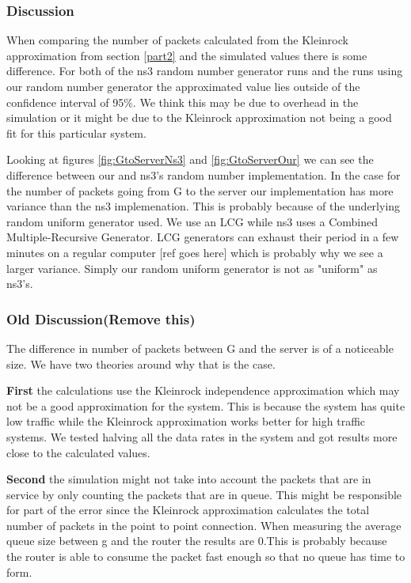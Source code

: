 \documentclass{article}
\begin{document}
\subsubsection{Discussion}
When comparing the number of packets calculated from the Kleinrock approximation from section \ref{part2} and the simulated values there is some difference.
For both of the ns3 random number generator runs and the runs using our random number generator the approximated value lies outside of the confidence interval of 95\%.
We think this may be due to overhead in the simulation or it might be due to the Kleinrock approximation not being a good fit for this particular system.

Looking at figures \ref{fig:GtoServerNs3} and \ref{fig:GtoServerOur} we can see the difference between our and ns3's random number implementation.
In the case for the number of packets going from G to the server our implementation has more variance than the ns3 implemenation.
This is probably because of the underlying random uniform generator used.
We use an LCG while ns3 uses a Combined Multiple-Recursive Generator.
LCG generators can exhaust their period in a few minutes on a regular computer [ref goes here] which is probably why we see a larger variance.
Simply our random uniform generator is not as "uniform" as ns3's.

\subsubsection{Old Discussion(Remove this)}
The difference in number of packets between G and the server is of a noticeable size. We have 
two theories around why that is the case.

\textbf{First} the calculations use the Kleinrock independence approximation which may not be 
a good approximation for the system. This is because the system has quite low traffic while the 
Kleinrock approximation works better for high traffic systems. We tested halving all the data 
rates in the system and got results more close to the calculated values.

\textbf{Second} the simulation might not take into account the packets that are in service 
by only counting the packets that are in queue. This might be responsible for part of the 
error since the Kleinrock approximation calculates the total number of packets in the point 
to point connection. When measuring the average queue size between g and the router the 
results are 0.This is probably because the router is able to consume the packet fast enough 
so that no queue has time to form.
\end{document}
